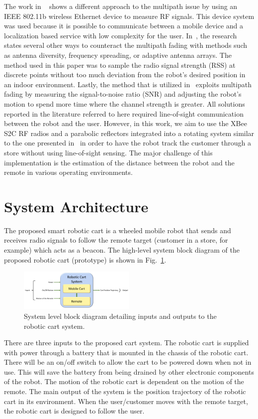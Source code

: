 \documentclass[conference]{IEEEtran}
\begin{document}
The work in ~\cite{ladd_bekris_rudys_kavraki_wallach_2005} shows a different
approach to the multipath issue by using an IEEE 802.11b wireless Ethernet
device to measure RF signals. This device system was used because it is possible to communicate between a mobile device and a localization based service with low
complexity for the user. In~\cite{lindhe_johansson_bicchi_2007}, the research
states several other ways to counteract the multipath fading with methods such
as antenna diversity, frequency spreading, or adaptive antenna arrays. The
method used in this paper was to sample the radio signal strength (RSS) at
discrete points without too much deviation from the robot's desired position in
an indoor environment. Lastly, the method that is utilized in~\cite{Lindhe2009}
exploits multipath fading by measuring the signal-to-noise ratio (SNR) and
adjusting the robot's motion to spend more time where the channel strength is
greater. All solutions reported in the literature referred to here required line-of-sight
communication between the robot and the user. However, in this work, we aim to use the
XBee S2C RF radios and a parabolic reflectors integrated into a rotating system
similar to the one presented in~\cite{Miah2018-Intelligent} in order to have the
robot track the customer through a store without using line-of-sight sensing.
The major challenge of this implementation is the estimation of the distance
between the robot and the remote in various operating environments.



\section{System Architecture}
\label{sec:systemArchitecture}
The proposed smart robotic cart is a wheeled mobile robot that sends and
receives radio signals to follow the remote target (customer in a store, for
example) which acts as a beacon. The high-level system block diagram of the
proposed robotic cart (prototype) is shown in Fig.~\ref{fig:sys_block_diag}. %
% 
\begin{figure}[htbp]
  \centering
  \includegraphics[width=0.5\textwidth]{figs/systemBlockDiagram.pdf}
  \caption{System level block diagram detailing inputs and outputs to the
    robotic cart system.}
	\label{fig:sys_block_diag}
\end{figure}
% 
There are three inputs to the proposed cart system. The robotic cart is supplied
with power through a battery that is mounted in the chassis of the robotic cart.
There will be an on/off switch to allow the cart to be powered down when not in
use. This will save the battery from being drained by other electronic
components of the robot. The motion of the robotic cart is dependent on the
motion of the remote. The main output of the system is the position trajectory
of the robotic cart in its environment. When the user/customer moves with the
remote target, the robotic cart is designed to follow the user.
\end{document}
